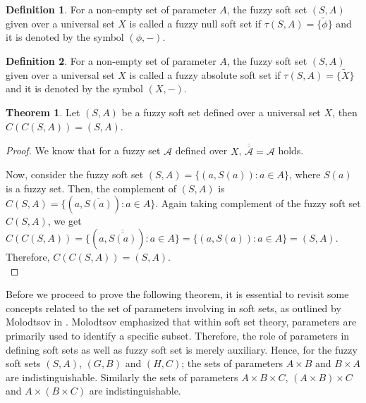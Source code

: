 \documentclass{article}
\theoremstyle{definition}
\newtheorem{theorem}{Theorem}[section]
\newtheorem{definition}{Definition}[section]
\begin{document}
\begin{definition}
     For a non-empty set of parameter $A$, the fuzzy soft set $(S,A)$ given over a universal set $X$ is called a fuzzy null soft set if $\tau(S,A)=\{\tilde{\phi} \}$ and it is denoted by the symbol $(\phi , -)$.
\end{definition}

\begin{definition}
     For a non-empty set of parameter $A$, the fuzzy soft set $(S,A)$ given over a universal set $X$ is called a fuzzy absolute soft set if $\tau(S,A)=\{\tilde{X} \}$ and it is denoted by the symbol $(X , -)$.
\end{definition}

\begin{theorem}
    Let $(S,A)$ be a fuzzy soft set defined over a universal set $X$, then $C(C(S,A))=(S,A)$.
    
\end{theorem}

\begin{proof}
    

 We know that for a fuzzy set $\mathcal{A}$ defined over $X$, $\overline{\overline{\mathcal{A}}}=\mathcal{A}$ holds.

 Now, consider the fuzzy soft set $(S,A)=\{(a, S(a)):a \in A\}$, where $S(a)$ is a fuzzy set. Then, the complement of $(S,A)$ is $C(S,A)=\{(a, \overline{S(a)}): a \in A\}$. Again taking complement of the fuzzy soft set $C(S,A)$, we get $C(C(S,A))=\{(a, \overline{\overline{S(a)}}): a \in A\}=\{(a, S(a)): a \in A\}=(S,A)$. Therefore, $C(C(S,A))=(S,A)$.\\
\end{proof}

Before we proceed to prove the following theorem, it is essential to revisit some concepts related to the set of parameters involving in soft sets, as outlined by Molodtsov in \cite{3} . Molodtsov \cite{3} emphasized that within soft set theory, parameters are primarily used to identify a specific subset. Therefore, the role of parameters in defining soft sets as well as fuzzy soft set is merely auxiliary. Hence, for the fuzzy soft sets $(S,A)$, $(G,B)$ and $(H,C)$; the sets of parameters $A\times B$ and $B\times A$ are indistinguishable. Similarly the sets of parameters $A\times B \times C$,  $(A\times B) \times C$ and $A\times (B \times C)$ are indistinguishable.\\
\end{document}
